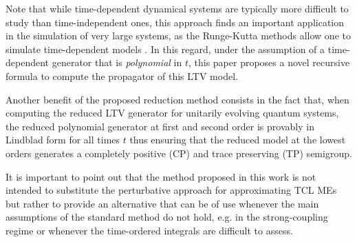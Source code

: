 \documentclass[twocolumn]{autart}    %
\begin{document}
Note that while time-dependent dynamical systems are typically more difficult to study than time-independent ones, this approach finds an important application in the simulation of very large systems, as the Runge-Kutta methods allow one to simulate time-dependent models \cite{ascher1997implicit}. In this regard, under the assumption of a time-dependent generator that is {\em polynomial} in $t$, this paper proposes a novel recursive formula to compute the propagator of this LTV model.

Another benefit of the proposed reduction method consists in the fact that, when computing the reduced LTV generator for unitarily evolving quantum systems, the reduced polynomial generator at first and second order is provably in Lindblad form for all times $t$ thus ensuring that the reduced model at the lowest orders generates a completely positive (CP) and trace preserving (TP) semigroup.   

It is important to point out that the method proposed in this work is not intended to substitute the perturbative approach for approximating TCL MEs \cite{shibata_generalized_1977,chaturvedi_time-convolutionless_1979} but rather to provide an alternative that can be of use whenever the main assumptions of the standard method do not hold, e.g. in the strong-coupling regime or whenever the time-ordered integrals are difficult to assess. 
\end{document}
